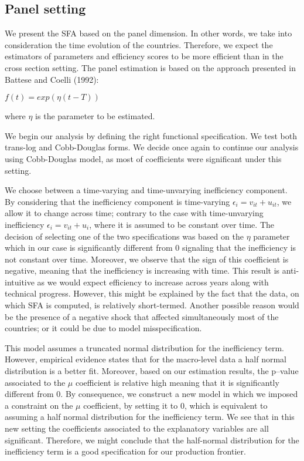 \documentclass[12pt,a4paper]{article}\usepackage[]{graphicx}\usepackage[]{color}
\begin{document}
\subsection{Panel setting}
We present the SFA based on the panel dimension. In other words, we take into consideration the time evolution of the countries. Therefore, we expect the estimators of parameters and efficiency scores to be more efficient than in the cross section setting. The panel estimation is based on the approach presented in Battese and Coelli (1992):
\begin{center}
$f(t)=exp(\eta(t-T))$ 
\end{center} 
where $\eta$ is the parameter to be estimated.

We begin our analysis by defining the right functional specification. We test both trans-log and Cobb-Douglas forms. We decide once again to continue our analysis using Cobb-Douglas   model, as most of coefficients were significant under this setting.

We choose between a time-varying and time-unvarying inefficiency component. By considering that the inefficiency component is time-varying $\epsilon_i=v_{it}+u_{it}$, we allow it to change across time; contrary to the case with time-unvarying inefficiency $\epsilon_i=v_{it}+ u_i$, where it is assumed to be constant over time.  The decision of selecting one of the two specifications was based on the $\eta$  parameter which in our case is significantly different from 0 signaling that the inefficiency is not constant over time.  Moreover, we observe that the sign of this coefficient is negative, meaning that the inefficiency is increasing with time. This result is anti-intuitive as we would expect efficiency to increase across years along with technical progress. However, this might be explained by the fact that the data, on which SFA is computed, is relatively short-termed. Another possible reason would be  the presence of a negative shock that affected simultaneously most of the countries; or it could be due to model misspecification.

This model assumes a truncated normal distribution for the inefficiency term. However, empirical evidence states that for the macro-level data a half normal distribution is a better fit.  Moreover, based on our estimation results, the p–value associated to the $\mu$ coefficient is relative high meaning that it is significantly different from 0. By consequence, we construct a new model in which we imposed a constraint on the $\mu$ coefficient, by setting it to 0,  which is equivalent to assuming a half normal distribution for the inefficiency term. We see that in this new setting the coefficients associated to the explanatory variables are all significant. Therefore, we might conclude that the half-normal distribution for the inefficiency term is a good specification for our production frontier.
\end{document}
